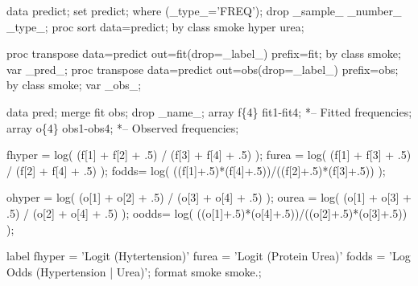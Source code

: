 \begin{listing}
data predict;
   set predict;
   where (_type_='FREQ');
   drop _sample_ _number_ _type_;
proc sort data=predict;
   by class smoke hyper urea;

proc transpose data=predict out=fit(drop=_label_) prefix=fit;
   by class smoke;
   var _pred_;
proc transpose data=predict out=obs(drop=_label_) prefix=obs;
   by class smoke;
   var _obs_;

data pred;
   merge fit obs;
   drop _name_;
   array f\{4\} fit1-fit4;   *-- Fitted frequencies;
   array o\{4\} obs1-obs4;   *-- Observed frequencies;
   
   fhyper = log( (f[1] + f[2] + .5) / (f[3] + f[4] + .5) );
   furea =  log( (f[1] + f[3] + .5) / (f[2] + f[4] + .5) );
   fodds=  log( ((f[1]+.5)*(f[4]+.5))/((f[2]+.5)*(f[3]+.5)) );
   
   ohyper = log( (o[1] + o[2] + .5) / (o[3] + o[4] + .5) );
   ourea =  log( (o[1] + o[3] + .5) / (o[2] + o[4] + .5) );
   oodds=  log( ((o[1]+.5)*(o[4]+.5))/((o[2]+.5)*(o[3]+.5)) );
   
   label fhyper = 'Logit (Hytertension)'
      furea =   'Logit (Protein Urea)'
      fodds = 'Log Odds (Hypertension | Urea)';
   format smoke smoke.;
\end{listing}
